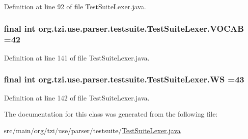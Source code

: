 Definition at line 92 of file Test\-Suite\-Lexer.\-java.

\hypertarget{classorg_1_1tzi_1_1use_1_1parser_1_1testsuite_1_1_test_suite_lexer_ae1fa96a8870c4b7d4eb33a591b89d5e0}{
\subsubsection[{V\-O\-C\-A\-B}]{\setlength{\rightskip}{0pt plus 5cm}final int org.\-tzi.\-use.\-parser.\-testsuite.\-Test\-Suite\-Lexer.\-V\-O\-C\-A\-B =42\hspace{0.3cm}{\ttfamily [static]}}}\label{classorg_1_1tzi_1_1use_1_1parser_1_1testsuite_1_1_test_suite_lexer_ae1fa96a8870c4b7d4eb33a591b89d5e0}


Definition at line 141 of file Test\-Suite\-Lexer.\-java.

\hypertarget{classorg_1_1tzi_1_1use_1_1parser_1_1testsuite_1_1_test_suite_lexer_a0113d991071e18bd3780c9691e2758c1}{
\subsubsection[{W\-S}]{\setlength{\rightskip}{0pt plus 5cm}final int org.\-tzi.\-use.\-parser.\-testsuite.\-Test\-Suite\-Lexer.\-W\-S =43\hspace{0.3cm}{\ttfamily [static]}}}\label{classorg_1_1tzi_1_1use_1_1parser_1_1testsuite_1_1_test_suite_lexer_a0113d991071e18bd3780c9691e2758c1}


Definition at line 142 of file Test\-Suite\-Lexer.\-java.



The documentation for this class was generated from the following file\-:\begin{DoxyCompactItemize}
\item 
src/main/org/tzi/use/parser/testsuite/\hyperlink{_test_suite_lexer_8java}{Test\-Suite\-Lexer.\-java}\end{DoxyCompactItemize}
